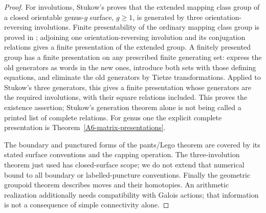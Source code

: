 \begin{proof}
For involutions, Stukow's \cite[Theorem 3.1]{Stukow2004A567} proves that the extended mapping class group of a closed orientable genus-$g$ surface, $g\ge1$, is generated by three orientation-reversing involutions. Finite presentability of the ordinary mapping class group is proved in \cite[\S5.3]{FarbMargalit2012A567}; adjoining one orientation-reversing involution and its conjugation relations gives a finite presentation of the extended group. A finitely presented group has a finite presentation on any prescribed finite generating set: express the old generators as words in the new ones, introduce both sets with those defining equations, and eliminate the old generators by Tietze transformations. Applied to Stukow's three generators, this gives a finite presentation whose generators are the required involutions, with their square relations included. This proves the existence assertion; Stukow's generation theorem alone is not being called a printed list of complete relations. For genus one the explicit complete presentation is Theorem~\ref{A6-matrix-presentations}.

The boundary and punctured forms of the pants/Lego theorem are covered by its stated surface conventions and the capping operation. The three-involution theorem just used has closed-surface scope; we do not extend that numerical bound to all boundary or labelled-puncture conventions. Finally the geometric groupoid theorem describes moves and their homotopies. An arithmetic realization additionally needs compatibility with Galois actions; that information is not a consequence of simple connectivity alone.
\end{proof}

